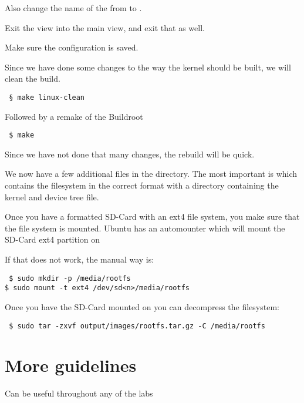Also change the name of the  from
 to .

Exit the view into the main view, and exit that as well.

Make sure the configuration is saved.

Since we have done some changes to the way the kernel should be built,
we will clean the build.


{\small
{\tt
\S \ make linux-clean
}
}

Followed by a remake of the Buildroot

{\small
{\tt
\$ make
}
}

Since we have not done that many changes, the rebuild will be quick.

We now have a few additional files in the  directory.
The most important is  which contains the filesystem
in the correct format with a  directory containing the kernel
and device tree file.

\clearpage

Once you have a formatted SD-Card with an ext4 file system,
you make sure that the file system is mounted.
Ubuntu has an automounter which will mount the SD-Card ext4
partition on 

If that does not work, the manual way is:

{\small
{\tt
\$ sudo mkdir -p /media/rootfs\\
\$ sudo mount -t ext4 /dev/sd\textless n\textgreater /media/rootfs
}
}

Once you have the SD-Card mounted on  you can decompress
the filesystem:

{\small
{\tt
\$ sudo tar -zxvf output/images/rootfs.tar.gz -C /media/rootfs
}
}



\clearpage
\section{More guidelines}

Can be useful throughout any of the labs

